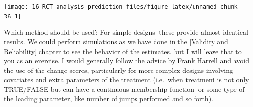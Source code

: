 \documentclass[
]{book}
\newenvironment{Shaded}{\begin{snugshade}}{\end{snugshade}}
\newcommand{\DataTypeTok}[1]{\textcolor[rgb]{0.13,0.29,0.53}{#1}}
\newcommand{\DecValTok}[1]{\textcolor[rgb]{0.00,0.00,0.81}{#1}}
\newcommand{\KeywordTok}[1]{\textcolor[rgb]{0.13,0.29,0.53}{\textbf{#1}}}
\newcommand{\NormalTok}[1]{#1}
\newcommand{\OperatorTok}[1]{\textcolor[rgb]{0.81,0.36,0.00}{\textbf{#1}}}
\newcommand{\StringTok}[1]{\textcolor[rgb]{0.31,0.60,0.02}{#1}}
\begin{document}
\begin{Shaded}
\end{Shaded}

\begin{center}\texttt{[image: 16-RCT-analysis-prediction\_files/figure-latex/unnamed-chunk-36-1]} \end{center}

Which method should be used? For simple designs, these provide almost identical results. We could perform simulations as we have done in the {[}Validity and Reliability{]} chapter to see the behavior of the estimates, but I will leave that to you as an exercise. I would generally follow the advice by \href{https://www.fharrell.com/post/errmed/\#change}{Frank Harrell} and avoid the use of the change scores, particularly for more complex designs involving covariates and extra parameters of the treatment (i.e.~when treatment is not only TRUE/FALSE but can have a continuous membership function, or some type of the loading parameter, like number of jumps performed and so forth).
\end{document}
